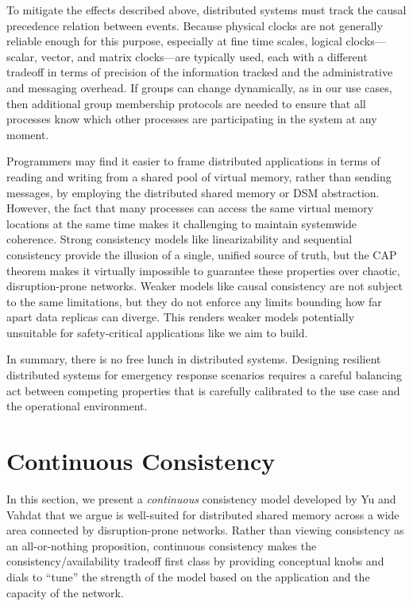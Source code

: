 \documentclass[]             %
{NASA}                       %
\theoremstyle{definition}
\begin{document}
To mitigate the effects described above, distributed systems must
track the causal precedence relation between events. Because physical
clocks are not generally reliable enough for this purpose, especially
at fine time scales, logical clocks---scalar, vector, and matrix
clocks---are typically used, each with a different tradeoff in terms
of precision of the information tracked and the administrative and
messaging overhead. If groups can change dynamically, as in our use
cases, then additional group membership protocols are needed to ensure
that all processes know which other processes are participating in the
system at any moment.

Programmers may find it easier to frame distributed applications in
terms of reading and writing from a shared pool of virtual memory,
rather than sending messages, by employing the distributed shared
memory or DSM abstraction. However, the fact that many processes can
access the same virtual memory locations at the same time makes it
challenging to maintain systemwide coherence. Strong consistency
models like linearizability and sequential consistency provide the
illusion of a single, unified source of truth, but the CAP theorem
makes it virtually impossible to guarantee these properties over
chaotic, disruption-prone networks. Weaker models like causal
consistency are not subject to the same limitations, but they do not
enforce any limits bounding how far apart data replicas can
diverge. This renders weaker models potentially unsuitable for
safety-critical applications like we aim to build.

In summary, there is no free lunch in distributed systems. Designing
resilient distributed systems for emergency response scenarios
requires a careful balancing act between competing properties that is
carefully calibrated to the use case and the operational environment.

\section{Continuous Consistency}
\label{sec:continuous-consistency}
In this section, we present a \emph{continuous} consistency model
developed by Yu and Vahdat \cite{2002tact} that we argue is
well-suited for distributed shared memory across a wide area connected
by disruption-prone networks. Rather than viewing consistency as an
all-or-nothing proposition, continuous consistency makes the
consistency/availability tradeoff first class by providing conceptual
knobs and dials to ``tune'' the strength of the model based on the
application and the capacity of the network.
\end{document}
